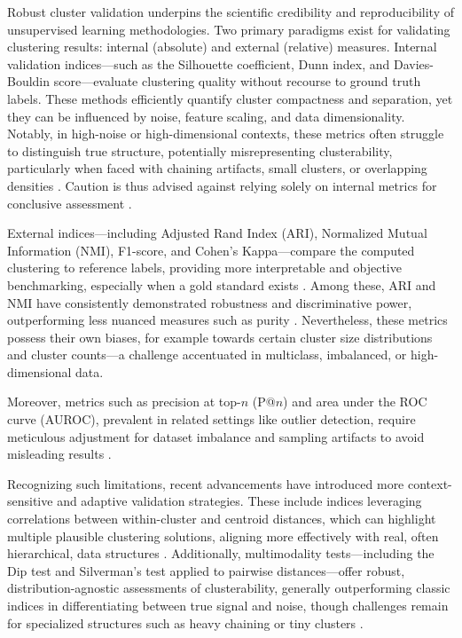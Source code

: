 \documentclass[sigconf]{acmart}
\begin{document}
Robust cluster validation underpins the scientific credibility and reproducibility of unsupervised learning methodologies. Two primary paradigms exist for validating clustering results: internal (absolute) and external (relative) measures. Internal validation indices—such as the Silhouette coefficient, Dunn index, and Davies-Bouldin score—evaluate clustering quality without recourse to ground truth labels. These methods efficiently quantify cluster compactness and separation, yet they can be influenced by noise, feature scaling, and data dimensionality. Notably, in high-noise or high-dimensional contexts, these metrics often struggle to distinguish true structure, potentially misrepresenting clusterability, particularly when faced with chaining artifacts, small clusters, or overlapping densities \cite{ref14,ref16,ref17,ref20,ref21,ref22,ref45,ref46,ref50,ref59,ref60,ref67,ref71,ref72,ref74,ref75,ref78,ref90,ref92,ref93,ref94,ref95,ref96,ref97,ref100,ref113}. Caution is thus advised against relying solely on internal metrics for conclusive assessment \cite{ref14,ref94}.

External indices—including Adjusted Rand Index (ARI), Normalized Mutual Information (NMI), F1-score, and Cohen’s Kappa—compare the computed clustering to reference labels, providing more interpretable and objective benchmarking, especially when a gold standard exists \cite{ref14,ref16,ref17,ref21,ref22,ref44,ref45,ref46,ref50,ref67,ref72,ref75,ref77,ref78,ref90,ref93,ref94,ref95,ref96,ref97,ref100,ref113}. Among these, ARI and NMI have consistently demonstrated robustness and discriminative power, outperforming less nuanced measures such as purity \cite{ref17,ref44}. Nevertheless, these metrics possess their own biases, for example towards certain cluster size distributions and cluster counts—a challenge accentuated in multiclass, imbalanced, or high-dimensional data.

Moreover, metrics such as precision at top-$n$ (P@$n$) and area under the ROC curve (AUROC), prevalent in related settings like outlier detection, require meticulous adjustment for dataset imbalance and sampling artifacts to avoid misleading results \cite{ref14}.

Recognizing such limitations, recent advancements have introduced more context-sensitive and adaptive validation strategies. These include indices leveraging correlations between within-cluster and centroid distances, which can highlight multiple plausible clustering solutions, aligning more effectively with real, often hierarchical, data structures \cite{ref17}. Additionally, multimodality tests—including the Dip test and Silverman’s test applied to pairwise distances—offer robust, distribution-agnostic assessments of clusterability, generally outperforming classic indices in differentiating between true signal and noise, though challenges remain for specialized structures such as heavy chaining or tiny clusters \cite{ref94,ref95}.
\end{document}
